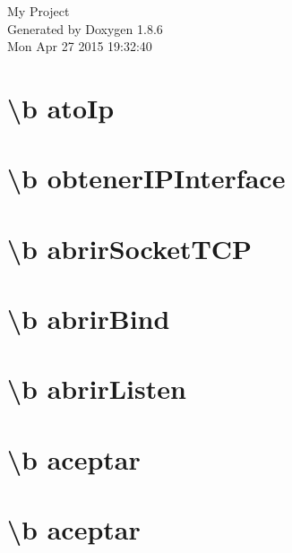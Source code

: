 \documentclass[twoside]{book}
\newcommand{\clearemptydoublepage}{%
  \newpage{\pagestyle{empty}\cleardoublepage}%
}
\begin{document}
\hypersetup{pageanchor=false}
\begin{titlepage}
\vspace*{7cm}
\begin{center}%
{\Large My Project }\\
\vspace*{1cm}
{\large Generated by Doxygen 1.8.6}\\
\vspace*{0.5cm}
{\small Mon Apr 27 2015 19:32:40}\\
\end{center}
\end{titlepage}
\clearemptydoublepage
\tableofcontents
\clearemptydoublepage
{}
\hypersetup{pageanchor=true}

\chapter{\textbackslash{}b ato\-Ip}
\label{ato_ip}
\hypertarget{ato_ip}{}

\chapter{\textbackslash{}b obtener\-I\-P\-Interface}
\label{obtener_i_p_interface}
\hypertarget{obtener_i_p_interface}{}

\chapter{\textbackslash{}b abrir\-Socket\-T\-C\-P}
\label{abrir_socket_t_c_p}
\hypertarget{abrir_socket_t_c_p}{}

\chapter{\textbackslash{}b abrir\-Bind}
\label{abrir_bind}
\hypertarget{abrir_bind}{}

\chapter{\textbackslash{}b abrir\-Listen}
\label{abrir_listen}
\hypertarget{abrir_listen}{}

\chapter{\textbackslash{}b aceptar}
\label{aceptar}
\hypertarget{aceptar}{}

\chapter{\textbackslash{}b aceptar}
\label{abrir_connect}
\hypertarget{abrir_connect}{}

\end{document}
